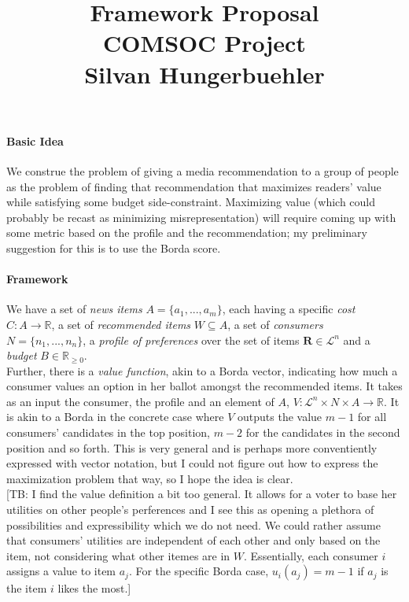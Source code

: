\documentclass[10pt,a4paper]{article}
\title{
  Framework Proposal\\ \large COMSOC Project
\\
  \large Silvan Hungerbuehler}
\date{}
\newcommand{\haukur}[1]{\textcolor[rgb]{.8,.33,.0}{[TB: #1]}}%
\begin{document}
\maketitle
\paragraph{Basic Idea}
We construe the problem of giving a media recommendation to a group of people as the problem of finding that recommendation that maximizes readers' value while satisfying some budget side-constraint. Maximizing value (which could probably be recast as minimizing misrepresentation) will require coming up with some metric based on the profile and the recommendation; my preliminary suggestion for this is to use the Borda score.
\paragraph{Framework}
We have a set of \emph{news items} $A=\{a_1,...,a_m\}$, each having a specific \emph{cost} $C: A\rightarrow \mathbb{R}$, a set of \emph{recommended items} $W\subseteq A$, a set of \emph{consumers} $N=\{n_1,...,n_n\}$, a \emph{profile of preferences} over the set of items $\mathbf{R}\in \mathcal{L}^n$ and a \emph{budget} $B\in \mathbb{R}_{\geq 0}$.\\
Further, there is a \emph{value function}, akin to a Borda vector, indicating how much a consumer values an option in her ballot amongst the recommended items. It takes as an input the consumer, the profile and an element of $A$,  $V: \mathcal{L}^n \times N \times  A \rightarrow \mathbb{R}$. It is akin to a Borda in the concrete case where $V$ outputs the value $m-1$ for all consumers' candidates in the top position, $m-2$ for the candidates in the second position and so forth. This is very general and is perhaps more conventiently expressed with vector notation, but I could not figure out how to express the maximization problem that way, so I hope the idea is clear.\\

\haukur{I find the value definition a bit too general. It allows for a voter to base her utilities on other people's perferences and I see this as opening a plethora of possibilities and expressibility which we do not need. We could rather assume that consumers' utilities are independent of each other and only based on the item, not considering what other itemes are in $W$. Essentially, each consumer $i$ assigns a value to item $a_j$. For the specific Borda case, $u_i(a_j)=m-1$ if $a_j$ is the item $i$ likes the most.}
\end{document}
